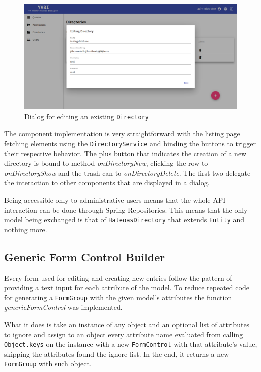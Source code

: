\begin{figure}
  \centering
  \includegraphics[width=.8\textwidth]{images/screenshots/directory/directory-edit}
  \caption{Dialog for editing an existing \texttt{Directory}}\label{fig:diredit}
\end{figure}

The component implementation is very straightforward with the listing page fetching elements using the \texttt{DirectoryService} and binding the buttons to trigger their respective behavior. The plus button that indicates the creation of a new directory is bound to method \textit{onDirectoryNew}, clicking the row to \textit{onDirectoryShow} and the trash can to \textit{onDirectoryDelete}. The first two delegate the interaction to other components that are displayed in a dialog. 

Being accessible only to administrative users means that the whole \gls{API} interaction can be done through Spring Repositories. This means that the only model being exchanged is that of \texttt{HateoasDirectory} that extends \texttt{Entity} and nothing more.

\subsection{Generic Form Control Builder}\label{gfcb}
Every form used for editing and creating new entries follow the pattern of providing a text input for each attribute of the model. To reduce repeated code for generating a \texttt{FormGroup} with the given model's attributes the function \textit{genericFormControl} was implemented.

What it does is take an instance of any object and an optional list of attributes to ignore and assign to an object every attribute name evaluated from calling \texttt{Object.keys} on the instance with a new \texttt{FormControl} with that attribute's value, skipping the attributes found the ignore-list. In the end, it returns a new \texttt{FormGroup} with such object.

